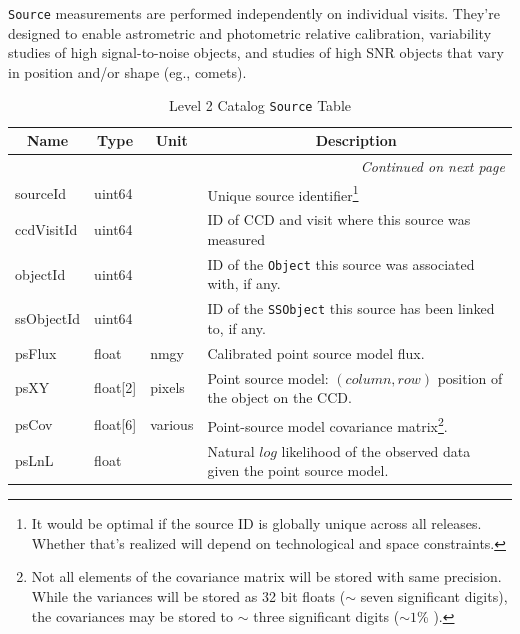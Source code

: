 \documentclass[12pt]{article}
\newcommand{\code}[1]{\texttt{#1}}
\newcommand{\Object}{\code{Object}\xspace}
\newcommand{\Source}{\code{Source}\xspace}
\newcommand{\SSObject}{\code{SSObject}\xspace}
\begin{document}
\Source measurements are performed independently on individual visits. They're designed to enable astrometric and photometric relative calibration, variability studies of high signal-to-noise objects, and studies of high SNR objects that vary in position and/or shape (eg., comets).

\begin{center}
\begin{longtable}{p{3cm}p{2cm}p{2cm}p{5cm}}
\caption[\Source Table]{Level 2 Catalog \Source Table
} \\

\hline \multicolumn{1}{c}{\bf Name} & \multicolumn{1}{c}{\bf Type} & \multicolumn{1}{c}{\bf Unit} & \multicolumn{1}{c}{\bf Description} \\ \hline
\endhead

\hline \multicolumn{4}{r}{{\em Continued on next page}} \\
\endfoot

\hline\hline
\endlastfoot

sourceId & uint64 & ~ & Unique source identifier\footnote{It would be optimal if the source ID is globally unique across all releases. Whether that's realized will depend on technological and space constraints.} \\ 

ccdVisitId & uint64 & ~ & ID of CCD and visit where this source was measured \\ 

objectId & uint64 & ~ & ID of the \Object this source was associated with, if any. \\ 

ssObjectId & uint64 & ~ & ID of the \SSObject this source has been linked to, if any. \\ 

psFlux & float & nmgy & Calibrated point source model flux.\\ 

psXY & float[2] & pixels & Point source model: $(column, row)$ position of the object on the CCD. \\

psCov & float[6] & various & Point-source model covariance matrix\footnote{Not all elements of the covariance matrix will be stored with same precision. While the variances will be stored as 32 bit floats ($\sim$ seven significant digits), the covariances may be stored to $\sim$ three significant digits ($\sim 1$\% ).}. \\ 

psLnL & float & ~ & Natural $log$ likelihood of the observed data given the point source model. \\ 


\end{longtable}
\end{center}
\end{document}
